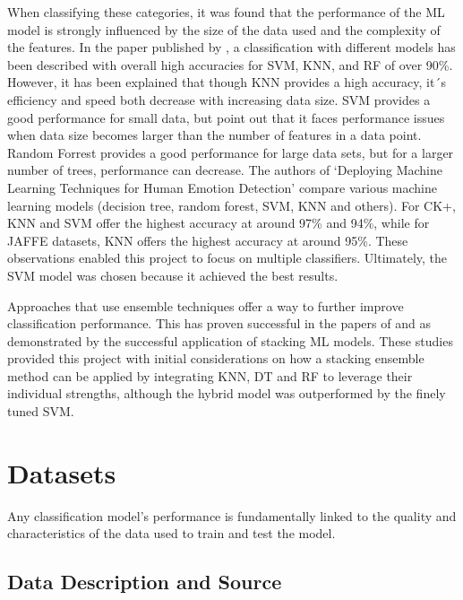 When classifying these categories, it was found that the performance of the ML model is strongly influenced by the size of the data used and the complexity of the features. In the paper published by \citep{Sharma2023}, a classification with different models has been described with overall high accuracies for SVM, KNN, and RF of over 90\%. However, it has been explained that though KNN provides a high accuracy, it´s efficiency and speed both decrease with increasing data size. SVM provides a good performance for small data, but \citep{Siam2022} point out that it faces performance issues when data size becomes larger than the number of features in a data point. Random Forrest provides a good performance for large data sets, but for a larger number of trees, performance can decrease. The authors of ‘Deploying Machine Learning Techniques for Human Emotion Detection’ \citep{Siam2022} compare various machine learning models (decision tree, random forest, SVM, KNN and others). For CK+, KNN and SVM offer the highest accuracy at around 97\% and 94\%, while for JAFFE datasets, KNN offers the highest accuracy at around 95\%. These observations enabled this project to focus on multiple classifiers. Ultimately, the SVM model was chosen because it achieved the best results.

Approaches that use ensemble techniques offer a way to further improve classification performance. This has proven successful in the papers of \citep{Xie2018} and \citep{Ma2024} as demonstrated by the successful application of stacking ML models. These studies provided this project with initial considerations on how a stacking ensemble method can be applied by integrating KNN, DT and RF to leverage their individual strengths, although the hybrid model was outperformed by the finely tuned SVM.
\newline

\chapter{Datasets}

Any classification model's performance is fundamentally linked to the quality and characteristics of the data used to train and test the model.
\newline

\section{Data Description and Source}

